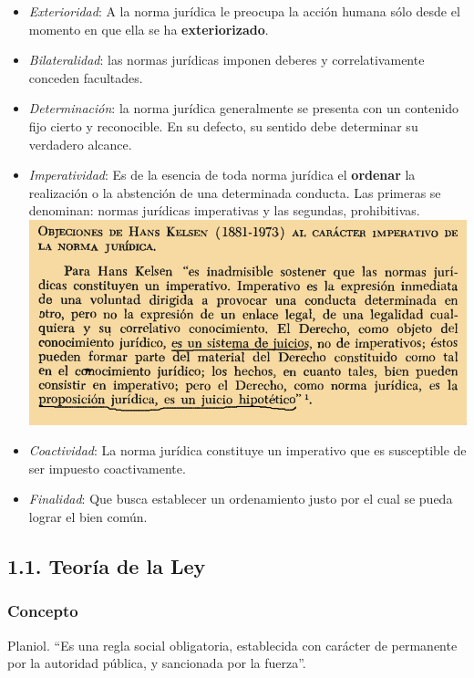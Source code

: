 \documentclass[]{article}
\providecommand{\tightlist}{%
  \setlength{\itemsep}{0pt}\setlength{\parskip}{0pt}}
\begin{document}
\begin{itemize}
\tightlist
\item
  \emph{Exterioridad}: A la norma jurídica le preocupa la acción humana
  sólo desde el momento en que ella se ha \textbf{exteriorizado}.
\item
  \emph{Bilateralidad}: las normas jurídicas imponen deberes y
  correlativamente conceden facultades.
\item
  \emph{Determinación}: la norma jurídica generalmente se presenta con
  un contenido fijo cierto y reconocible. En su defecto, su sentido debe
  determinar su verdadero alcance.
\item
  \emph{Imperatividad}: Es de la esencia de toda norma jurídica el
  \textbf{ordenar} la realización o la abstención de una determinada
  conducta. Las primeras se denominan: normas jurídicas imperativas y
  las segundas, prohibitivas. \includegraphics{objkelsen.png?raw=true}
\item
  \emph{Coactividad}: La norma jurídica constituye un imperativo que es
  susceptible de ser impuesto coactivamente.
\item
  \emph{Finalidad}: Que busca establecer un ordenamiento justo por el
  cual se pueda lograr el bien común.
\end{itemize}

\hypertarget{teoruxeda-de-la-ley}{%
\subsection{1.1. Teoría de la Ley}\label{teoruxeda-de-la-ley}}

\hypertarget{concepto}{%
\subsubsection{Concepto}\label{concepto}}

Planiol. ``Es una regla social obligatoria, establecida con carácter de
permanente por la autoridad pública, y sancionada por la fuerza''.
\end{document}
